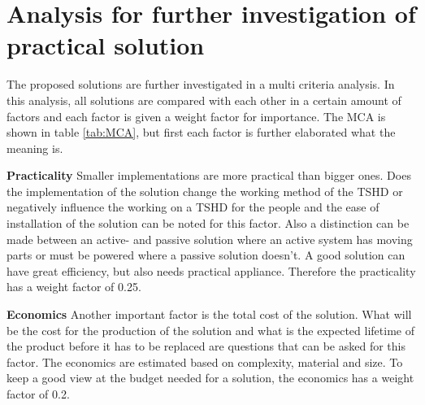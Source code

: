 












\section{Analysis for further investigation of practical solution}

The proposed solutions are further investigated in a multi criteria analysis. In this analysis, all solutions are compared with each other in a certain amount of factors and each factor is given a weight factor for importance. The MCA is shown in table \ref{tab:MCA}, but first each factor is further elaborated what the meaning is.  \newline

\noindent \textbf{Practicality}\newline
Smaller implementations are more practical than bigger ones. Does the implementation of the solution change the working method of the TSHD or negatively influence the working on a TSHD for the people and the ease of installation of the solution can be noted for this factor. Also a distinction can be made between an active- and passive solution where an active system has moving parts or must be powered where a passive solution doesn't. A good solution can have great efficiency, but also needs practical appliance. Therefore the practicality has a weight factor of 0.25.\newline

\noindent \textbf{Economics} \newline
Another important factor is the total cost of the solution. What will be the cost for the production of the solution and what is the expected lifetime of the product before it has to be replaced are questions that can be asked for this factor. The economics are estimated based on complexity, material and size. To keep a good view at the budget needed for a solution, the economics has a weight factor of 0.2.\newline

